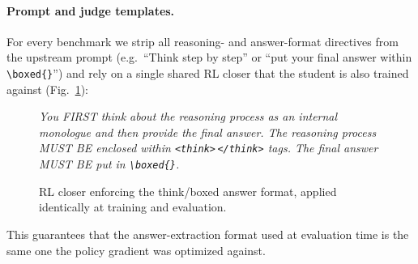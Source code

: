 \documentclass{llmxive}
\begin{document}
\paragraph{Prompt and judge templates.}
For every benchmark we strip all reasoning- and answer-format directives from the upstream prompt (e.g.\ ``Think step by step'' or ``put your final answer within \verb|\boxed{}|'') and rely on a single shared RL closer that the student is also trained against (Fig.~\ref{fig:prompt-rl-closer}):
\begin{figure}[!htbp]
\begin{prompttemplatefig}
\small
\emph{You FIRST think about the reasoning process as an internal monologue and then provide the final answer. The reasoning process MUST BE enclosed within \texttt{<think>}\,\texttt{</think>} tags. The final answer MUST BE put in \texttt{\textbackslash boxed\{\}}.}
\end{prompttemplatefig}
\caption{RL closer enforcing the think/boxed answer format, applied identically at training and evaluation.}
\label{fig:prompt-rl-closer}
\end{figure}
This guarantees that the answer-extraction format used at evaluation time is the same one the policy gradient was optimized against.
\end{document}
